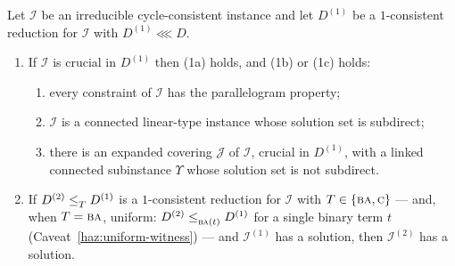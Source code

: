 \begin{longtheorem}\label{thm:main-inductive}
Let $\mathcal I$ be an irreducible cycle-consistent instance and let $D^{(1)}$
be a $1$-consistent reduction for $\mathcal I$ with $D^{(1)}\lll D$.
\begin{enumerate}\tightlist
\item[\textup{(1)}] If $\mathcal I$ is crucial in $D^{(1)}$ then
  \textup{(1a)} holds, and \textup{(1b)} or \textup{(1c)} holds:
  \begin{enumerate}\tightlist
  \item[\textup{(1a)}] every constraint of $\mathcal I$ has the parallelogram
    property;
  \item[\textup{(1b)}] $\mathcal I$ is a connected linear-type instance whose
    solution set is subdirect;
  \item[\textup{(1c)}] there is an expanded covering $\mathcal J$ of
    $\mathcal I$, crucial in $D^{(1)}$, with a linked connected subinstance
    $\Upsilon$ whose solution set is not subdirect.
  \end{enumerate}
\item[\textup{(2)}] If $D^{(2)}\le_{T}^{}D^{(1)}$ is a $1$-consistent reduction
  for $\mathcal I$ with $T\in\{\textup{\textsc{ba}},\textup{\textsc{c}}\}$ --- and, when $T=\textup{\textsc{ba}}$, uniform:
  $D^{(2)}\le_{\textup{\textsc{ba}}(t)}^{}D^{(1)}$ for a single binary term $t$
  (Caveat~\ref{haz:uniform-witness}) --- and $\mathcal I^{(1)}$ has a solution,
  then $\mathcal I^{(2)}$ has a solution.
\end{enumerate}
\end{longtheorem}

